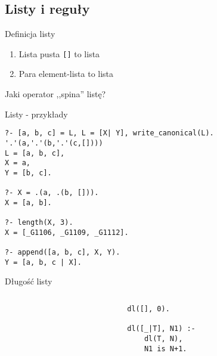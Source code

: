 \documentclass[blue]{beamer}
\begin{document}
\subsection{Listy i reguły}
\begin{frame}[fragile]{Definicja listy}
\begin{enumerate}
\item Lista pusta \verb+[]+ to lista
\item Para element-lista to lista
\end{enumerate}

Jaki operator ,,spina'' listę?


\end{frame}
\begin{frame}[fragile]{Listy - przykłady}
\begin{lstlisting}
?- [a, b, c] = L, L = [X| Y], write_canonical(L).
'.'(a,'.'(b,'.'(c,[])))
L = [a, b, c],
X = a,
Y = [b, c].

?- X = .(a, .(b, [])).
X = [a, b].

?- length(X, 3).
X = [_G1106, _G1109, _G1112].

?- append([a, b, c], X, Y).
Y = [a, b, c | X].
\end{lstlisting}
\end{frame}
\begin{frame}[fragile]{Długość listy}
\begin{columns}
\begin{column}{.5\linewidth}
\end{column}
\begin{column}{.5\linewidth}
\begin{lstlisting}
dl([], 0).

dl([_|T], N1) :-
    dl(T, N),
    N1 is N+1.
\end{lstlisting}
\end{column}
\end{columns}
\end{frame}
\end{document}

